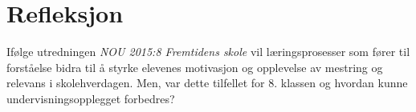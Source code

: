 \documentclass[main.tex]{subfiles}
\begin{document}
\section*{Refleksjon}
\label{sec:3}

Ifølge utredningen \emph{NOU 2015:8 Fremtidens skole} vil læringsprosesser som fører til forståelse 
bidra til å styrke elevenes motivasjon og opplevelse av mestring og relevans i skolehverdagen. Men, 
var dette tilfellet for 8. klassen og hvordan kunne undervisningsopplegget forbedres?
\newline
\newline
\end{document}
